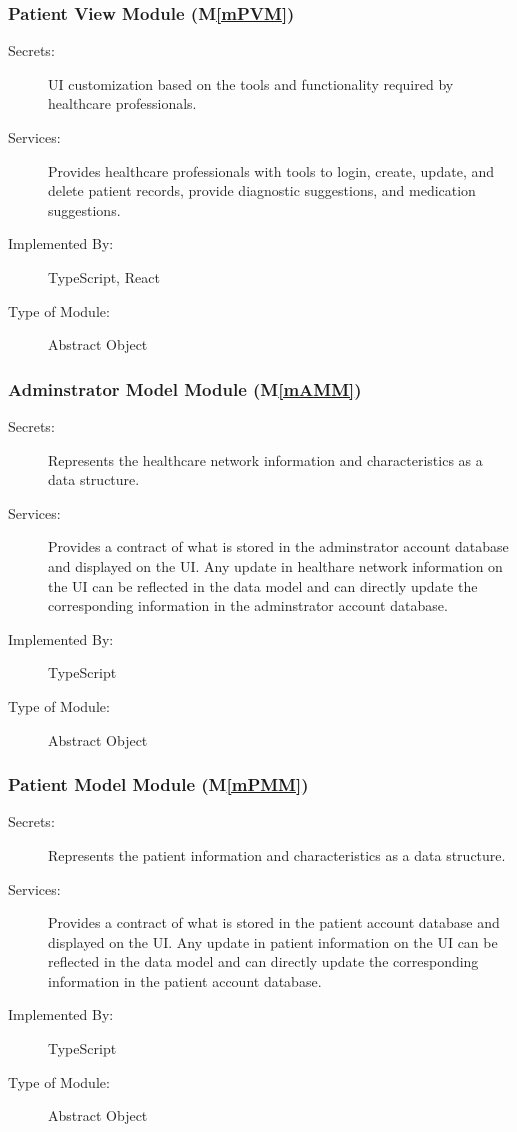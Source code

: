 \documentclass[12pt, titlepage]{article}
\newcommand{\mref}[1]{M\ref{#1}}
\begin{document}
\subsubsection{Patient View Module (\mref{mPVM})}

\begin{description}
\item[Secrets:]UI customization based on the tools and functionality required by healthcare professionals.
\item[Services:]Provides healthcare professionals with tools to login, create, update, and delete patient records, provide diagnostic suggestions, and medication suggestions.
\item[Implemented By:]TypeScript, React
\item[Type of Module:]Abstract Object
\end{description}

\subsubsection{Adminstrator Model Module (\mref{mAMM})}

\begin{description}
\item[Secrets:]Represents the healthcare network information and characteristics as a data structure.
\item[Services:]Provides a contract of what is stored in the adminstrator account database and displayed on the UI. Any update in healthare network information on the UI can be reflected in the data model and can directly update the corresponding information in the adminstrator account database.
\item[Implemented By:]TypeScript
\item[Type of Module:]Abstract Object
\end{description}

\subsubsection{Patient Model Module (\mref{mPMM})}

\begin{description}
\item[Secrets:]Represents the patient information and characteristics as a data structure. 
\item[Services:]Provides a contract of what is stored in the patient account database and displayed on the UI. Any update in patient information on the UI can be reflected in the data model and can directly update the corresponding information in the patient account database.
\item[Implemented By:]TypeScript
\item[Type of Module:]Abstract Object
\end{description}
\end{document}
